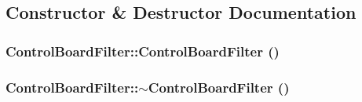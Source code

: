 \subsection{Constructor \& Destructor Documentation}
\hypertarget{classyarp_1_1os_1_1_control_board_filter_a4cd0bdff78668dd46a8a567b3ce60144}{
\subsubsection[{ControlBoardFilter}]{\setlength{\rightskip}{0pt plus 5cm}ControlBoardFilter::ControlBoardFilter ()}}
\label{classyarp_1_1os_1_1_control_board_filter_a4cd0bdff78668dd46a8a567b3ce60144}
\hypertarget{classyarp_1_1os_1_1_control_board_filter_a5c3f6dd113745a570fd06d616cc4e16a}{
\subsubsection[{$\sim$ControlBoardFilter}]{\setlength{\rightskip}{0pt plus 5cm}ControlBoardFilter::$\sim$ControlBoardFilter ()}}
\label{classyarp_1_1os_1_1_control_board_filter_a5c3f6dd113745a570fd06d616cc4e16a}


